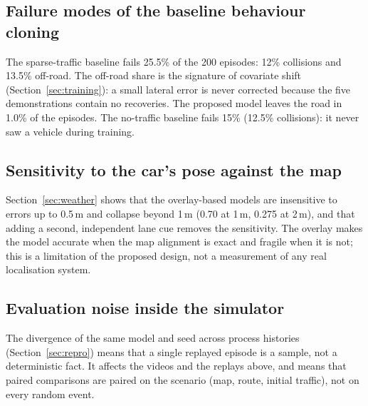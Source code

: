 \subsection{Failure modes of the baseline behaviour cloning}
The sparse-traffic baseline fails 25.5\% of the 200 episodes: 12\% collisions and 13.5\% off-road. The off-road share is the signature of covariate shift (Section~\ref{sec:training}): a small lateral error is never corrected because the five demonstrations contain no recoveries. The proposed model leaves the road in 1.0\% of the episodes. The no-traffic baseline fails 15\% (12.5\% collisions): it never saw a vehicle during training.

\subsection{Sensitivity to the car's pose against the map}
Section~\ref{sec:weather} shows that the overlay-based models are insensitive to errors up to 0.5\,m and collapse beyond 1\,m (0.70 at 1\,m, 0.275 at 2\,m), and that adding a second, independent lane cue removes the sensitivity. The overlay makes the model accurate when the map alignment is exact and fragile when it is not; this is a limitation of the proposed design, not a measurement of any real localisation system.

\subsection{Evaluation noise inside the simulator}
The divergence of the same model and seed across process histories (Section~\ref{sec:repro}) means that a single replayed episode is a sample, not a deterministic fact. It affects the videos and the replays above, and means that paired comparisons are paired on the scenario (map, route, initial traffic), not on every random event.


